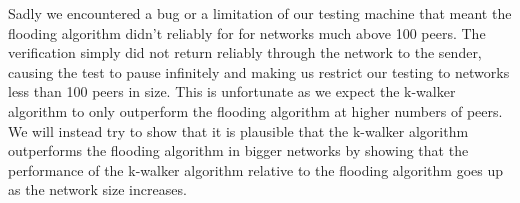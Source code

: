 Sadly we encountered a bug or a limitation of our testing machine that meant the flooding algorithm didn't reliably for for networks much above 100 peers. The verification simply did not return reliably through the network to the sender, causing the test to pause infinitely and making us restrict our testing to networks less than 100 peers in size. This is unfortunate as we expect the k-walker algorithm to only outperform the flooding algorithm at higher numbers of peers. We will instead try to show that it is plausible that the k-walker algorithm outperforms the flooding algorithm in bigger networks by showing that the performance of the k-walker algorithm relative to the flooding algorithm goes up as the network size increases.


